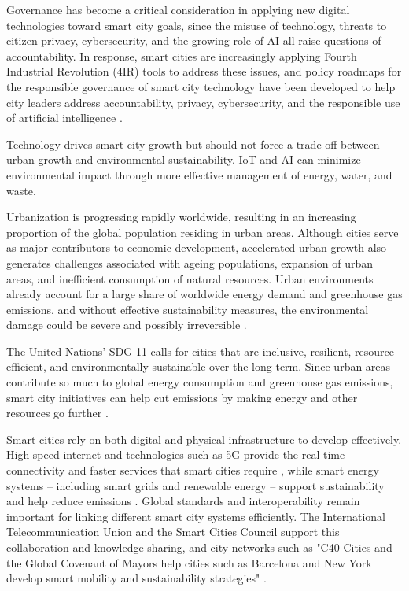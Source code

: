 \documentclass[pdflatex,sn-mathphys-num]{sn-jnl}%
\theoremstyle{thmstyleone}%
\theoremstyle{thmstyletwo}%
\theoremstyle{thmstylethree}%
\begin{document}
Governance has become a critical consideration in applying new digital technologies toward smart city goals, since the misuse of technology, threats to citizen privacy, cybersecurity, and the growing role of AI all raise questions of accountability. In response, smart cities are increasingly applying Fourth Industrial Revolution (4IR) tools to address these issues, and policy roadmaps for the responsible governance of smart city technology have been developed to help city leaders address accountability, privacy, cybersecurity, and the responsible use of artificial intelligence \cite{r94,r117}.

Technology drives smart city growth but should not force a trade-off between urban growth and environmental sustainability. IoT and AI can minimize environmental impact through more effective management of energy, water, and waste.

Urbanization is progressing rapidly worldwide, resulting in an increasing proportion of the global population residing in urban areas. Although cities serve as major contributors to economic development, accelerated urban growth also generates challenges associated with ageing populations, expansion of urban areas, and inefficient consumption of natural resources. Urban environments already account for a large share of worldwide energy demand and greenhouse gas emissions, and without effective sustainability measures, the environmental damage could be severe and possibly irreversible \cite{r119}.

The United Nations' SDG 11 calls for cities that are inclusive, resilient, resource-efficient, and environmentally sustainable over the long term. Since urban areas contribute so much to global energy consumption and greenhouse gas emissions, smart city initiatives can help cut emissions by making energy and other resources go further \cite{r85,r120}.

Smart cities rely on both digital and physical infrastructure to develop effectively. High-speed internet and technologies such as 5G provide the real-time connectivity and faster services that smart cities require \cite{r97}, while smart energy systems -- including smart grids and renewable energy -- support sustainability and help reduce emissions \cite{r98}. Global standards and interoperability remain important for linking different smart city systems efficiently. The International Telecommunication Union and the Smart Cities Council support this collaboration and knowledge sharing, and city networks such as "C40 Cities and the Global Covenant of Mayors help cities such as Barcelona and New York develop smart mobility and sustainability strategies" \cite{r86,r94}.
\end{document}
